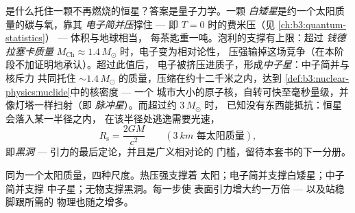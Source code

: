 \begin{proposition}[白矮星与中子星]\label{prop:b3:astrophysics:compact}
是什么托住一颗不再燃烧的恒星？答案是量子力学。一颗
\emph{白矮星}是约一个太阳质量的碳与氧，靠其
\emph{电子简并压}撑住 --- 即 $T = 0$ 时的费米压（见
\cref{ch:b3:quantum-statistics}） --- 体积与地球相当，
每茶匙重一吨。泡利的支撑有上限：超过
\emph{钱德拉塞卡质量} $M_{\text{Ch}}
\approx 1.4\,M_\odot$ 时，电子变为相对论性，
压强输掉这场竞争（在本阶段不加证明地承认）。超过此值后，
电子被挤压进质子，形成\emph{中子星}：中子简并与核斥力
共同托住
$\sim1.4\,M_\odot$ 的质量，压缩在约十二千米之内，达到
\cref{def:b3:nuclear-physics:nuclide}中的核密度 --- 一个
城市大小的原子核，自转可快至毫秒量级，并像灯塔一样扫射（即
\emph{脉冲星}）。而超过约 $3\,M_\odot$ 时，
已知没有东西能抵抗：恒星会落入某一半径之内，
在该半径处逃逸需要光速，
\[
R_{\text{s}} = \frac{2GM}{c^2}
\qquad (\qty{3}{km}\text{ 每太阳质量}) ,
\]
即\emph{黑洞} --- 引力的最后定论，并且是广义相对论的
门槛，留待本套书的下一分册。
\end{proposition}
\admitted

\begin{omfigure}

{\small 同为一个太阳质量，四种尺度。热压强支撑着
太阳；电子简并支撑白矮星；中子简并支撑
中子星；无物支撑黑洞。每一步使
表面引力增大约一万倍 --- 以及站稳脚跟所需的
物理也随之增多。}
\end{omfigure}

